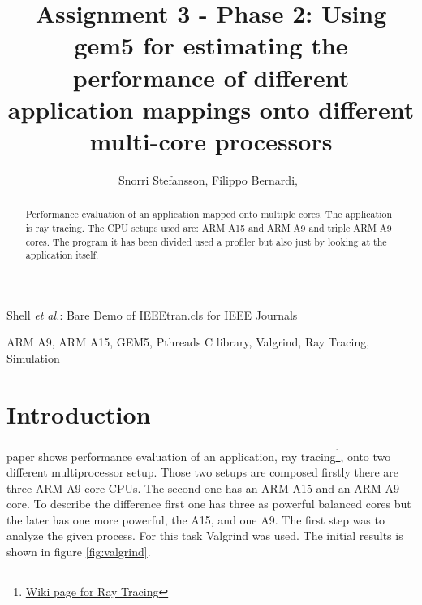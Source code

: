 \documentclass[journal]{IEEEtran}
\begin{document}
\title{Assignment 3 - Phase 2: Using gem5 for estimating the performance of different application mappings onto different multi-core processors
}

\author{Snorri Stefansson, Filippo Bernardi,~
}



%
{Shell \MakeLowercase{\textit{et al.}}: Bare Demo of IEEEtran.cls for IEEE Journals}


\maketitle

\begin{abstract}
Performance evaluation of an application mapped onto multiple cores. The application is ray tracing. The CPU setups used are: ARM A15 and ARM A9 and triple ARM A9 cores. The program it has been divided used a profiler but also just by looking at the application itself. 
\end{abstract}

\begin{IEEEkeywords}
ARM A9, ARM A15, GEM5, Pthreads C library, Valgrind, Ray Tracing, Simulation
\end{IEEEkeywords}


\IEEEpeerreviewmaketitle

\section{Introduction}

 paper shows performance evaluation of an application, ray tracing\footnote{\hyperref{https://en.wikipedia.org/wiki/Ray_tracing_(graphics)}{}{Ray Tracing}{Wiki page for Ray Tracing}}, onto two different multiprocessor setup. Those two setups are composed firstly there are three ARM A9 core CPUs. The second one has an ARM A15 and an ARM A9 core.
To describe the difference first one has three as powerful balanced cores but the later has one more powerful, the A15, and one A9.
The first step was to analyze the given process. For this task Valgrind was used.
The initial results is shown in figure \ref{fig:valgrind}.
\end{document}
